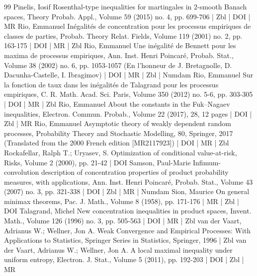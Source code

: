 \documentclass[10pt]{amsart}
\theoremstyle{definition}\newtheorem{defi}[theo]{Definition}\newtheorem{rema}[theo]{Remark}\newtheorem{exam}[theo]{Example}\newtheorem{exem}[theo]{Example}\newtheorem{nota}[theo]{Notation}
\begin{document}
\begin{thebibliography}{99}
Pinelis, Iosif Rosenthal-type inequalities for martingales in 2-smooth Banach spaces, Theory Probab. Appl., Volume 59 (2015) no. 4, pp. 699-706 | Zbl | DOI | MR
Rio, Emmanuel Inégalités de concentration pour les processus empiriques de classes de parties, Probab. Theory Relat. Fields, Volume 119 (2001) no. 2, pp. 163-175 | DOI | MR | Zbl
Rio, Emmanuel Une inégalité de Bennett pour les maxima de processus empiriques, Ann. Inst. Henri Poincaré, Probab. Stat., Volume 38 (2002) no. 6, pp. 1053-1057 (En l’honneur de J. Bretagnolle, D. Dacunha-Castelle, I. Ibragimov) | DOI | MR | Zbl | Numdam
Rio, Emmanuel Sur la fonction de taux dans les inégalités de Talagrand pour les processus empiriques, C. R. Math. Acad. Sci. Paris, Volume 350 (2012) no. 5-6, pp. 303-305 | DOI | MR | Zbl
Rio, Emmanuel About the constants in the Fuk–Nagaev inequalities, Electron. Commun. Probab., Volume 22 (2017), 28, 12 pages | DOI | Zbl | MR
Rio, Emmanuel Asymptotic theory of weakly dependent random processes, Probability Theory and Stochastic Modelling, 80, Springer, 2017 (Translated from the 2000 French edition [MR2117923]) | DOI | MR | Zbl
Rockafellar, Ralph T.; Uryasev, S. Optimization of conditional value-at-risk, Risks, Volume 2 (2000), pp. 21-42 | DOI
Samson, Paul-Marie Infimum-convolution description of concentration properties of product probability measures, with applications, Ann. Inst. Henri Poincaré, Probab. Stat., Volume 43 (2007) no. 3, pp. 321-338 | DOI | Zbl | MR | Numdam
Sion, Maurice On general minimax theorems, Pac. J. Math., Volume 8 (1958), pp. 171-176 | MR | Zbl | DOI
Talagrand, Michel New concentration inequalities in product spaces, Invent. Math., Volume 126 (1996) no. 3, pp. 505-563 | DOI | MR | Zbl
van der Vaart, Adrianus W.; Wellner, Jon A. Weak Convergence and Empirical Processes: With Applications to Statistics, Springer Series in Statistics, Springer, 1996 | Zbl
van der Vaart, Adrianus W.; Wellner, Jon A. A local maximal inequality under uniform entropy, Electron. J. Stat., Volume 5 (2011), pp. 192-203 | DOI | Zbl | MR
\end{thebibliography}
\end{document}
